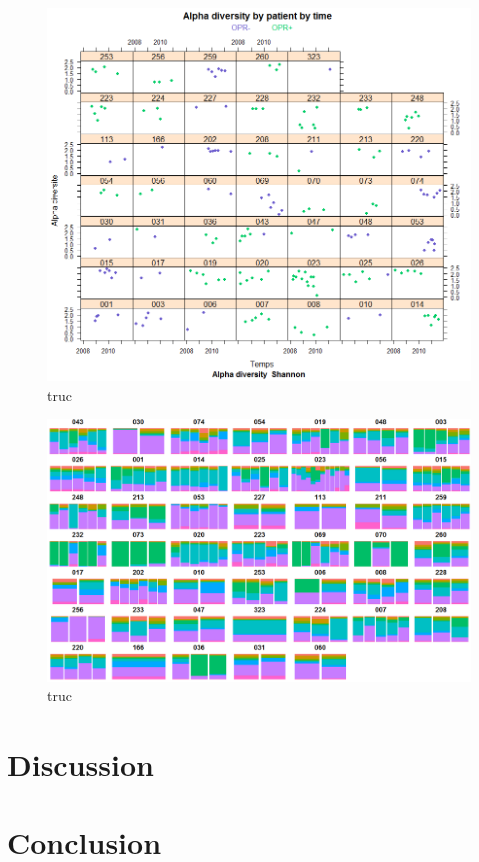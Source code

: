 \documentclass[12pt,a4paper]{article}
\begin{document}
\begin{figure}[h]
\begin{center}
\includegraphics[scale=0.5]{img/all_alpha_shanon.png}\hfill
\end{center}
\caption{truc}
\label{shannon}
\end{figure}


\begin{figure}[h]
\begin{center}
\includegraphics[scale=0.5]{img/evolution_Core.png}\hfill
\end{center}
\caption{truc}
\label{core}
\end{figure}




\section{Discussion}


\section{Conclusion}




\newpage




\end{document}
